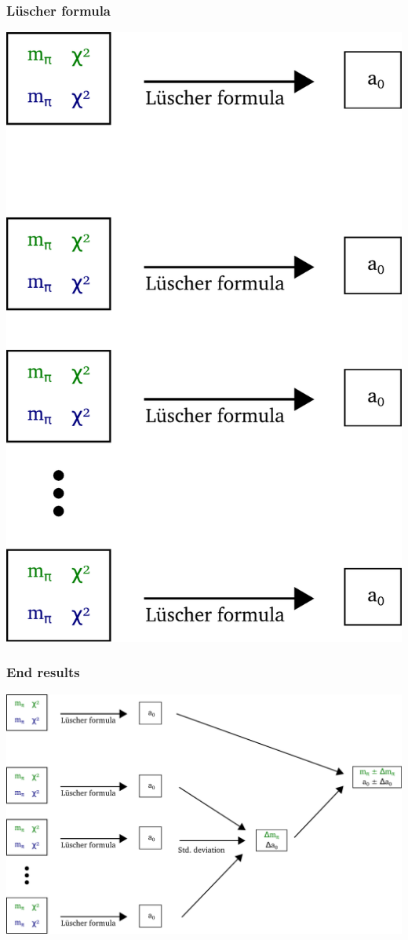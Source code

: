 \documentclass[english, fleqn]{beamer}
\begin{document}
\begin{frame}
    \frametitle{Lüscher formula}
    \includegraphics[scale=\scale]{sketches/07-luescher.pdf}
\end{frame}

\begin{frame}
    \frametitle{End results}
    \includegraphics[scale=\scale]{sketches/08-end-result.pdf}
\end{frame}


\begin{frame}

    \printbibliography
\end{frame}
\end{document}
